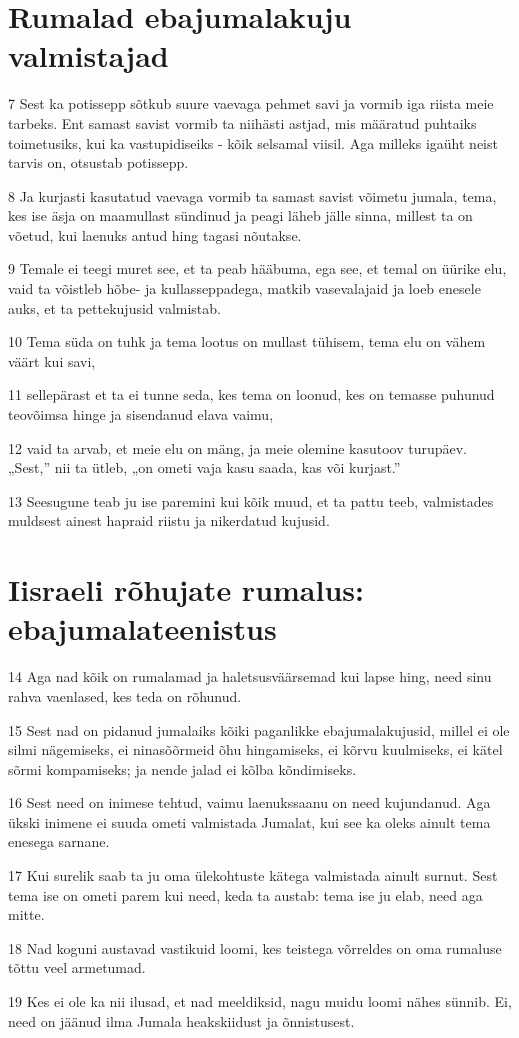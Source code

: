 \section*{Rumalad ebajumalakuju valmistajad}

\par 7 Sest ka potissepp sõtkub suure vaevaga pehmet savi ja vormib iga riista meie tarbeks. Ent samast savist vormib ta niihästi astjad, mis määratud puhtaiks toimetusiks, kui ka vastupidiseiks - kõik selsamal viisil. Aga milleks igaüht neist tarvis on, otsustab potissepp.
\par 8 Ja kurjasti kasutatud vaevaga vormib ta samast savist võimetu jumala, tema, kes ise äsja on maamullast sündinud ja peagi läheb jälle sinna, millest ta on võetud, kui laenuks antud hing tagasi nõutakse.
\par 9 Temale ei teegi muret see, et ta peab hääbuma, ega see, et temal on üürike elu, vaid ta võistleb hõbe- ja kullasseppadega, matkib vasevalajaid ja loeb enesele auks, et ta pettekujusid valmistab.
\par 10 Tema süda on tuhk ja tema lootus on mullast tühisem, tema elu on vähem väärt kui savi,
\par 11 sellepärast et ta ei tunne seda, kes tema on loonud, kes on temasse puhunud teovõimsa hinge ja sisendanud elava vaimu,
\par 12 vaid ta arvab, et meie elu on mäng, ja meie olemine kasutoov turupäev. „Sest,” nii ta ütleb, „on ometi vaja kasu saada, kas või kurjast.”
\par 13 Seesugune teab ju ise paremini kui kõik muud, et ta pattu teeb, valmistades muldsest ainest hapraid riistu ja nikerdatud kujusid. 

\section*{Iisraeli rõhujate rumalus: ebajumalateenistus}

\par 14 Aga nad kõik on rumalamad ja haletsusväärsemad kui lapse hing, need sinu rahva vaenlased, kes teda on rõhunud.
\par 15 Sest nad on pidanud jumalaiks kõiki paganlikke ebajumalakujusid, millel ei ole silmi nägemiseks, ei ninasõõrmeid õhu hingamiseks, ei kõrvu kuulmiseks, ei kätel sõrmi kompamiseks; ja nende jalad ei kõlba kõndimiseks.
\par 16 Sest need on inimese tehtud, vaimu laenukssaanu on need kujundanud. Aga ükski inimene ei suuda ometi valmistada Jumalat, kui see ka oleks ainult tema enesega sarnane.
\par 17 Kui surelik saab ta ju oma ülekohtuste kätega valmistada ainult surnut. Sest tema ise on ometi parem kui need, keda ta austab: tema ise ju elab, need aga mitte.
\par 18 Nad koguni austavad vastikuid loomi, kes teistega võrreldes on oma rumaluse tõttu veel armetumad.
\par 19 Kes ei ole ka nii ilusad, et nad meeldiksid, nagu muidu loomi nähes sünnib. Ei, need on jäänud ilma Jumala heakskiidust ja õnnistusest. 

